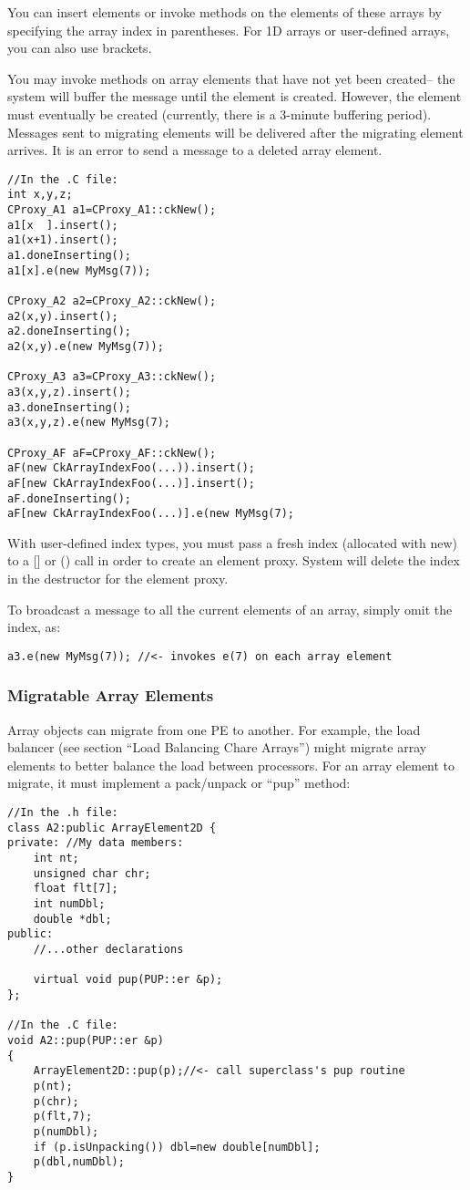You can insert elements or invoke methods on the elements of these
arrays by specifying the array index in parentheses.  For 1D 
arrays or user-defined arrays, you can also use brackets.

You may invoke methods on array elements that have not yet
been created-- the system will buffer the message until the
element is created.  However, the element must eventually be 
created (currently, there is a 3-minute buffering period).
Messages sent to migrating elements will be delivered after
the migrating element arrives.  It is an error to send 
a message to a deleted array element.

\begin{verbatim}
//In the .C file:
int x,y,z;
CProxy_A1 a1=CProxy_A1::ckNew();
a1[x  ].insert(); 
a1(x+1).insert();
a1.doneInserting();
a1[x].e(new MyMsg(7));

CProxy_A2 a2=CProxy_A2::ckNew(); 
a2(x,y).insert();
a2.doneInserting();
a2(x,y).e(new MyMsg(7));

CProxy_A3 a3=CProxy_A3::ckNew();
a3(x,y,z).insert();
a3.doneInserting();
a3(x,y,z).e(new MyMsg(7);

CProxy_AF aF=CProxy_AF::ckNew();
aF(new CkArrayIndexFoo(...)).insert();
aF[new CkArrayIndexFoo(...)].insert();
aF.doneInserting();
aF[new CkArrayIndexFoo(...)].e(new MyMsg(7);

\end{verbatim}
With user-defined index types, you must pass a fresh index 
(allocated with new) to a [] or () call in order to create an element proxy.
System will delete the index in the destructor for the element proxy.

To broadcast a message to all the current elements of an array, 
simply omit the index, as:

\begin{verbatim}
a3.e(new MyMsg(7)); //<- invokes e(7) on each array element
\end{verbatim}

\subsubsection{Migratable Array Elements}
Array objects can migrate from one PE to another.
For example, the load balancer (see section ``Load Balancing Chare Arrays'')
might migrate array elements to better balance the load between
processors.  For an array element to migrate, it must implement
a pack/unpack or ``pup'' method:

\begin{verbatim}
//In the .h file:
class A2:public ArrayElement2D {
private: //My data members:
    int nt;
    unsigned char chr;
    float flt[7];
    int numDbl;
    double *dbl;
public:	
    //...other declarations

    virtual void pup(PUP::er &p);
};

//In the .C file:
void A2::pup(PUP::er &p)
{
    ArrayElement2D::pup(p);//<- call superclass's pup routine
    p(nt);
    p(chr);
    p(flt,7);
    p(numDbl);
    if (p.isUnpacking()) dbl=new double[numDbl];
    p(dbl,numDbl);
}
\end{verbatim}

